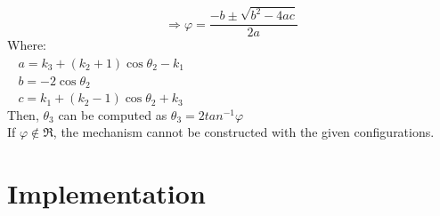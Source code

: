 \documentclass[]{beamer}
\begin{document}
{{ $$\Rightarrow \varphi=\frac{-b\pm \sqrt{b^2-4ac}}{2a}$$
 }
 {
 Where:\\
 \vspace{0.5cm}
 $~~~~a=k_3+(k_2+1)\cos \theta_2 -k_1$\\
 $~~~~b=-2\cos \theta_2$\\
 $~~~~c=k_1+(k_2-1)\cos \theta_2 + k_3$\\
 \vspace{0.5cm}
 Then, $\theta_3$ can be computed as $\theta_3=2tan^{-1} \varphi$\\
 \vspace{0.5cm}
 If $\varphi \not\in \Re$, the mechanism cannot be constructed with the given configurations.\\
 
 }
 }

\section{Implementation}
\end{document}
